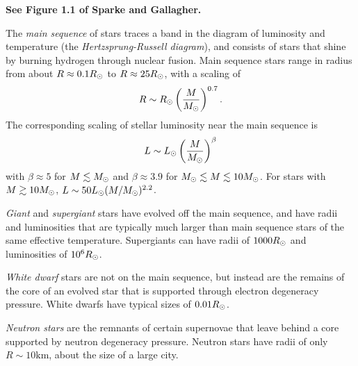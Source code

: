 \documentclass[]{article}
\begin{document}
{\bf See Figure 1.1 of Sparke and Gallagher.}

The {\it main sequence} of stars traces a band in the diagram of luminosity and
temperature (the {\it Hertzsprung-Russell diagram}), and consists of stars that
shine by burning hydrogen through nuclear fusion. Main sequence stars range in
radius from about $R\approx0.1R_{\odot}$ to $R\approx25R_{\odot}$, with a scaling of
\begin{equation}
R\sim R_{\odot}\left(\frac{M}{M_{\odot}}\right)^{0.7}.
\end{equation}
\noindent
The corresponding scaling of stellar luminosity near the main sequence is
\begin{equation}
L\sim L_{\odot}\left(\frac{M}{M_{\odot}}\right)^{\beta}
\end{equation}
\noindent
with $\beta\approx5$ for $M\lesssim M_{\odot}$ and 
$\beta\approx3.9$ for $M_{\odot}\lesssim M \lesssim 10M_{\odot}$. For stars
with $M\gtrsim10M_{\odot}$, $L\sim50L_{\odot}(M/M_{\odot})^{2.2}$.

{\it Giant} and {\it supergiant} stars have evolved off the main sequence, and
have radii and luminosities that are typically much larger than main sequence
stars of the same effective temperature. Supergiants can have radii of $1000R_{\odot}$
and luminosities of $10^{6}R_{\odot}$.

{\it White dwarf} stars are not on the main sequence, but instead are the
remains of the core of an evolved star that is supported through electron
degeneracy pressure. White dwarfs have typical sizes of $0.01R_{\odot}$.

{\it Neutron stars} are the remnants of certain supernovae that leave behind
a core supported by neutron degeneracy pressure. Neutron stars have radii 
of only $R\sim10\mathrm{km}$, about the size of a large city.
\end{document}
